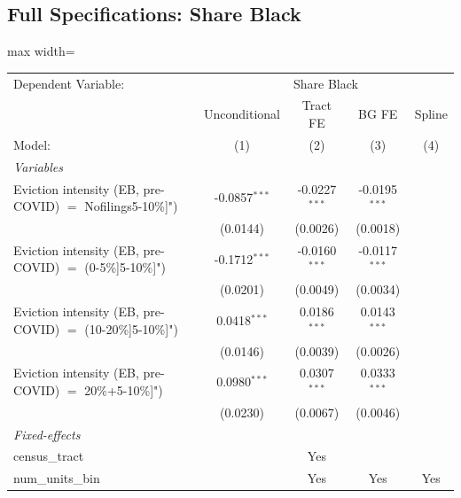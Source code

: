 \documentclass[
  11pt,
]{article}
\begin{document}
\subsection{Full Specifications: Share
Black}\label{full-specifications-share-black}

\begin{adjustbox}{max width=\textwidth}
\begingroup
\centering
\begin{tabular}{lcccc}
   \tabularnewline \midrule \midrule
   Dependent Variable: & \multicolumn{4}{c}{Share Black}\\
                                                               & Unconditional   & Tract FE        & BG FE           & Spline \\   
   Model:                                                      & (1)             & (2)             & (3)             & (4)\\  
   \midrule
   \emph{Variables}\\
   Eviction intensity (EB, pre-COVID) $=$ Nofilings5-10\%]")   & -0.0857$^{***}$ & -0.0227$^{***}$ & -0.0195$^{***}$ &   \\   
                                                               & (0.0144)        & (0.0026)        & (0.0018)        &   \\   
   Eviction intensity (EB, pre-COVID) $=$ (0-5\%]5-10\%]")     & -0.1712$^{***}$ & -0.0160$^{***}$ & -0.0117$^{***}$ &   \\   
                                                               & (0.0201)        & (0.0049)        & (0.0034)        &   \\   
   Eviction intensity (EB, pre-COVID) $=$ (10-20\%]5-10\%]")   & 0.0418$^{***}$  & 0.0186$^{***}$  & 0.0143$^{***}$  &   \\   
                                                               & (0.0146)        & (0.0039)        & (0.0026)        &   \\   
   Eviction intensity (EB, pre-COVID) $=$ 20\%+5-10\%]")       & 0.0980$^{***}$  & 0.0307$^{***}$  & 0.0333$^{***}$  &   \\   
                                                               & (0.0230)        & (0.0067)        & (0.0046)        &   \\   
   \midrule
   \emph{Fixed-effects}\\
   census\_tract                                               &                 & Yes             &                 & \\  
   num\_units\_bin                                             &                 & Yes             & Yes             & Yes\\  

\end{tabular}
\end{adjustbox}
\end{document}
